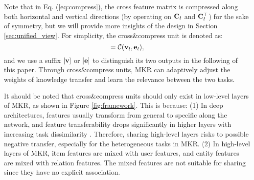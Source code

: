 \documentclass[sigconf]{acmart}
\begin{document}
		Note that in Eq. (\ref{eq:compress}), the cross feature matrix is compressed along both horizontal and vertical directions (by operating on ${\bf C}_l$ and ${\bf C}_l^\top$) for the sake of symmetry, but we will provide more insights of the design in Section \ref{sec:unified_view}.
		For simplicity, the cross$\&$compress unit is denoted as:
		\begin{equation}
			[{\bf v}_{l+1}, {\bf e}_{l+1}] = \mathcal C ({\bf v}_l, {\bf e}_l),
		\end{equation}
		and we use a suffix $[{\bf v}]$ or $[{\bf e}]$ to distinguish its two outputs in the following of this paper.
		Through cross$\&$compress units, MKR can adaptively adjust the weights of knowledge transfer and learn the relevance between the two tasks.
		
		It should be noted that cross$\&$compress units should only exist in low-level layers of MKR, as shown in Figure \ref{fig:framework}.
		This is because:
		(1) In deep architectures, features usually transform from general to specific along the network, and feature transferability drops significantly in higher layers with increasing task dissimilarity \cite{yosinski2014transferable}.
		Therefore, sharing high-level layers risks to possible negative transfer, especially for the heterogeneous tasks in MKR.
		(2) In high-level layers of MKR, item features are mixed with user features, and entity features are mixed with relation features.
		The mixed features are not suitable for sharing since they have no explicit association.
		
		
\end{document}
